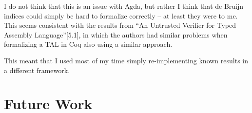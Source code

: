 I do not think that this is an issue with Agda, but rather I think that de
Bruijn indices could simply be hard to formalize correctly -- at least they were
to me. This seems consistent with the results from ``An Untrusted Verifier for
Typed Assembly Language''\cite{untrusted}[5.1], in which the authors had similar
problems when formalizing a TAL in Coq also using a similar approach.

This meant that I used most of my time simply re-implementing known results in a
different framework.

\section{Future Work}
